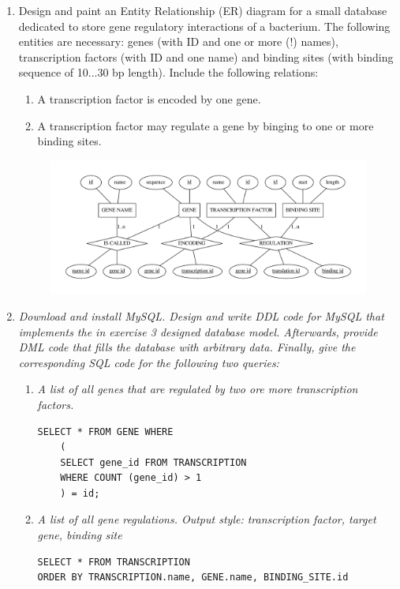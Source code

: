 \documentclass[a4paper,10pt,titlepage]{article}
\begin{document}
\begin{enumerate}
\item
Design and paint an Entity Relationship (ER) diagram for a small database dedicated to store gene regulatory interactions of a bacterium. The following entities are necessary: genes (with ID and one or more (!) names), transcription factors (with ID and one name) and binding sites (with binding sequence of 10...30 bp length). Include the following relations: 
\begin{enumerate}
\item 
A transcription factor is encoded by one gene. 
\item 
A transcription factor may regulate a gene by binging to one or more binding sites.
\end{enumerate}
\begin{figure}[H]
\centering
\includegraphics[scale=0.4]{graph.pdf}

\end{figure}
\item
\textit{Download and install MySQL. Design and write DDL code for MySQL that implements the in exercise 3 designed database model. Afterwards, provide DML code that fills the database with arbitrary data. Finally, give the corresponding 
SQL code for the following two queries:}
\begin{enumerate}
\item
\textit{A list of all genes that are regulated by two ore more transcription factors.}

\begin{lstlisting}
SELECT * FROM GENE WHERE 
	(
	SELECT gene_id FROM TRANSCRIPTION 
	WHERE COUNT (gene_id) > 1
	) = id;
\end{lstlisting}

\item
\textit{A list of all gene regulations. Output style: transcription factor, target gene, binding site}
\begin{lstlisting}
SELECT * FROM TRANSCRIPTION 
ORDER BY TRANSCRIPTION.name, GENE.name, BINDING_SITE.id
\end{lstlisting}



\end{enumerate}
\end{enumerate}
\end{document}
